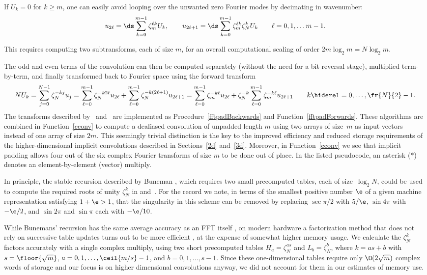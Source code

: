 \documentclass[final]{siamltex}
\def\bel{\begin{dmath}}
\def\eel{\end{dmath}}
\def\belc{\begin{equation}}
\def\eelc{\end{equation}}
\def\no{\hiderel}
\begin{document}
If $U_k=0$ for $k \ge m$, one can easily avoid looping over the
unwanted zero Fourier modes by decimating in wavenumber:
\belc
u_{2\ell}
=\ds\sum_{k=0}^{m-1}\zeta_m^{\ell k} U_k,
\qquad
u_{2\ell+1}
=\ds\sum_{k=0}^{m-1}\zeta_m^{\ell k} \zeta_N^kU_k
\qquad
\ell=0,1,\ldots m-1.\label{cconv1backwards} 
\eelc

This requires computing two subtransforms, each of size $m$,
for an overall computational scaling of order $2m\log_2 m=N\log_2 m$.

The odd and even terms of the convolution can then be computed separately
(without the need for a bit reversal stage), multiplied term-by-term, and
finally transformed back to Fourier space using the forward transform
\bel
NU_k=\sum_{j=0}^{N-1}\zeta_N^{-kj} u_j
=\sum_{\ell=0}^{m-1}\zeta_N^{-k2\ell} u_{2\ell}
+\sum_{\ell=0}^{m-1}\zeta_N^{-k(2\ell+1)} u_{2\ell+1}
=\sum_{\ell=0}^{m-1}\zeta_m^{-k\ell} u_{2\ell}
+\zeta_N^{-k}\sum_{\ell=0}^{m-1}\zeta_m^{-k\ell} u_{2\ell+1}
\qquad k\no=0,\ldots,\fr{N}{2}-1.\label{cconv1forwards}
\eel
The transforms described by~ and~
are implemented as Procedure~\ref{fftpadBackwards} and
Function~\ref{fftpadForwards}.
These algorithms are combined in Function~\ref{cconv} to 
compute a dealiased convolution of unpadded length $m$ using
two arrays of size~$m$ as input vectors instead of one array of size $2m$.
This seemingly trivial distinction is the key to the improved efficiency
and reduced storage requirements of the higher-dimensional implicit
convolutions described in Sections~\ref{2d} and~\ref{3d}.
Moreover, in Function~\ref{cconv} we see that implicit padding allows four
out of the six complex Fourier transforms of size $m$ to be done out of place.
In the listed pseudocode, an asterisk ($*$) denotes an element-by-element
(vector) multiply.

In principle, the stable recursion described by Buneman \cite{Buneman87},
which requires two small precomputed tables, each of size~$\log_2 N$, could be
used to compute the required roots of unity $\zeta_N^k$
in  and~. For the record we note,
in terms of the smallest positive number $\e$ of a given machine
representation satisfying $1+\e > 1$, that the singularity in this scheme can be
removed by replacing $\sec{\pi/2}$ with  $5/\e$, $\sin 4\pi$ with $-\e/2$, and
$\sin{2\pi}$ and $\sin{\pi}$ each with $-\e/10$.

While Bunemans' recursion has the same average accuracy as an FFT
itself \cite{Tasche02}, on modern hardware a factorization method that does
not rely on successive table updates turns out to be more
efficient \cite{Johnson09}, at the expense of somewhat higher memory usage.
We calculate the $\zeta_N^k$ factors accurately with a single complex
multiply, using two short precomputed tables $H_a=\zeta_N^{as}$ and
$L_b=\zeta_N^b$, where $k=as+b$ with $s=\floor{\sqrt m}$,
$a=0,1,\ldots,\ceil{m/s}-1$, and $b=0,1,\ldots,s-1$. Since these
one-dimensional tables require only $\O(2\sqrt{m})$ complex words of
storage and our focus is on higher dimensional convolutions anyway, we did
not account for them in our estimates of memory use. 
\end{document}
